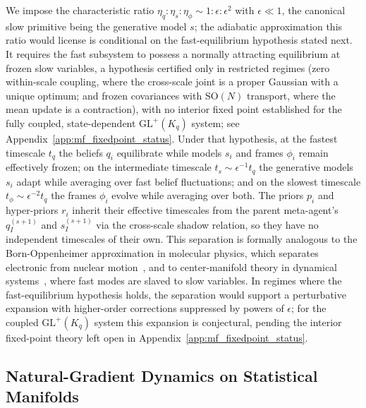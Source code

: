 \documentclass[11pt]{article}
\begin{document}
We impose the characteristic ratio $\eta_q : \eta_s : \eta_\phi \sim 1 : \epsilon : \epsilon^2$ with $\epsilon \ll 1$, the canonical slow primitive being the generative model $s$; the adiabatic approximation this ratio would license is conditional on the fast-equilibrium hypothesis stated next. It requires the fast subsystem to possess a normally attracting equilibrium at frozen slow variables, a hypothesis certified only in restricted regimes (zero within-scale coupling, where the cross-scale joint is a proper Gaussian with a unique optimum; and frozen covariances with $\mathrm{SO}(N)$ transport, where the mean update is a contraction), with no interior fixed point established for the fully coupled, state-dependent $\mathrm{GL}^+(K_q)$ system; see Appendix~\ref{app:mf_fixedpoint_status}. Under that hypothesis, at the fastest timescale $t_q$ the beliefs $q_i$ equilibrate while models $s_i$ and frames $\phi_i$ remain effectively frozen; on the intermediate timescale $t_s \sim \epsilon^{-1} t_q$ the generative models $s_i$ adapt while averaging over fast belief fluctuations; and on the slowest timescale $t_\phi \sim \epsilon^{-2} t_q$ the frames $\phi_i$ evolve while averaging over both. The priors $p_i$ and hyper-priors $r_i$ inherit their effective timescales from the parent meta-agent's $q_I^{(s+1)}$ and $s_I^{(s+1)}$ via the cross-scale shadow relation, so they have no independent timescales of their own. This separation is formally analogous to the Born-Oppenheimer approximation in molecular physics, which separates electronic from nuclear motion~\cite{Born1927}, and to center-manifold theory in dynamical systems~\cite{Carr1981}, where fast modes are slaved to slow variables. In regimes where the fast-equilibrium hypothesis holds, the separation would support a perturbative expansion with higher-order corrections suppressed by powers of $\epsilon$; for the coupled $\mathrm{GL}^+(K_q)$ system this expansion is conjectural, pending the interior fixed-point theory left open in Appendix~\ref{app:mf_fixedpoint_status}.

\subsection{Natural-Gradient Dynamics on Statistical Manifolds}
\end{document}
